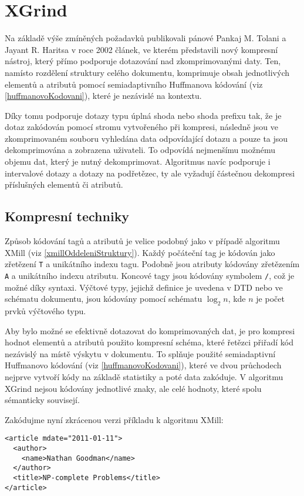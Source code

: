 \section{XGrind}
\label{xgrind}
Na základě výše zmíněných požadavků publikovali pánové Pankaj M. Tolani a Jayant R. Haritsa v roce 2002 článek, ve kterém představili nový kompresní nástroj, který přímo podporuje dotazování nad zkomprimovanými daty. Ten, namísto rozdělení struktury celého dokumentu, komprimuje obsah jednotlivých elementů a atributů pomocí semiadaptivního Huffmanova kódování (viz \ref{huffmanovoKodovani}), které je nezávislé na kontextu.

Díky tomu podporuje dotazy typu úplná shoda nebo shoda prefixu tak, že je dotaz zakódován pomocí stromu vytvořeného při kompresi, následně jsou ve zkomprimovaném souboru vyhledána data odpovídající dotazu a pouze ta jsou dekomprimována a zobrazena uživateli. To odpovídá nejmenšímu možnému objemu dat, který je nutný dekomprimovat. Algoritmus navíc podporuje i intervalové dotazy a dotazy na podřetězec, ty ale vyžadují částečnou dekompresi příslušných elementů či atributů. \cite{xgrind}

\subsection{Kompresní techniky}
\label{xgrindKompresniTechniky}
Způsob kódování tagů a atributů je velice podobný jako v případě algoritmu XMill (viz \ref{xmillOddeleniStruktury}). Každý počáteční tag je kódován jako zřetězení \texttt{T} a unikátního indexu tagu. Podobně jsou atributy kódovány zřetězením \texttt{A} a unikátního indexu atributu. Koncové tagy jsou kódovány symbolem \texttt{/}, což je možné díky syntaxi. Výčtové typy, jejichž definice je uvedena v DTD nebo ve schématu dokumentu, jsou kódovány pomocí schématu $\log_2n$, kde $n$ je počet prvků výčtového typu.

Aby bylo možné se efektivně dotazovat do komprimovaných dat, je pro kompresi hodnot elementů a atributů použito kompresní schéma, které řetězci přiřadí kód nezávislý na místě výskytu v dokumentu. To splňuje použité semiadaptivní Huffmanovo kódování (viz \ref{huffmanovoKodovani}), které ve dvou průchodech nejprve vytvoří kódy na základě statistiky a poté data zakóduje. V algoritmu XGrind nejsou kódovány jednotlivé znaky, ale celé hodnoty, které spolu sémanticky souvisejí. \cite{xgrind}

Zakódujme nyní zkrácenou verzi příkladu k algoritmu XMill:
\begin{verbatim}
<article mdate="2011-01-11">
  <author>
    <name>Nathan Goodman</name>
  </author>
  <title>NP-complete Problems</title>
</article>
\end{verbatim}

